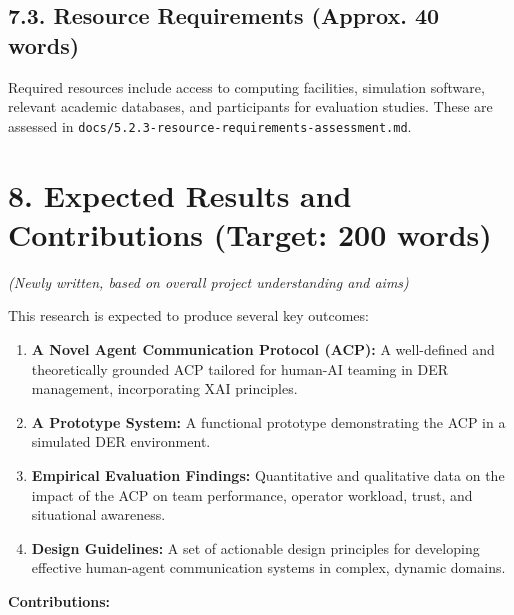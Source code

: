 \documentclass[12pt,a4paper]{article}
\begin{document}
\begin{itemize}
\begin{itemize}
\begin{itemize}
\begin{itemize}
\begin{itemize}
\begin{itemize}
\begin{itemize}
\subsection{7.3. Resource Requirements (Approx. 40 words)}
Required resources include access to computing facilities, simulation software, relevant academic databases, and participants for evaluation studies. These are assessed in \texttt{docs/5.2.3-resource-requirements-assessment.md}.

\section{8. Expected Results and Contributions (Target: 200 words)}

\emph{(Newly written, based on overall project understanding and aims)}

This research is expected to produce several key outcomes:

\begin{enumerate}
\item  \textbf{A Novel Agent Communication Protocol (ACP):} A well-defined and theoretically grounded ACP tailored for human-AI teaming in DER management, incorporating XAI principles.
\item  \textbf{A Prototype System:} A functional prototype demonstrating the ACP in a simulated DER environment.
\item  \textbf{Empirical Evaluation Findings:} Quantitative and qualitative data on the impact of the ACP on team performance, operator workload, trust, and situational awareness.
\item  \textbf{Design Guidelines:} A set of actionable design principles for developing effective human-agent communication systems in complex, dynamic domains.
\end{enumerate}

\textbf{Contributions:}

\end{itemize}
\end{itemize}
\end{itemize}
\end{itemize}
\end{itemize}
\end{itemize}
\end{itemize}
\end{document}
